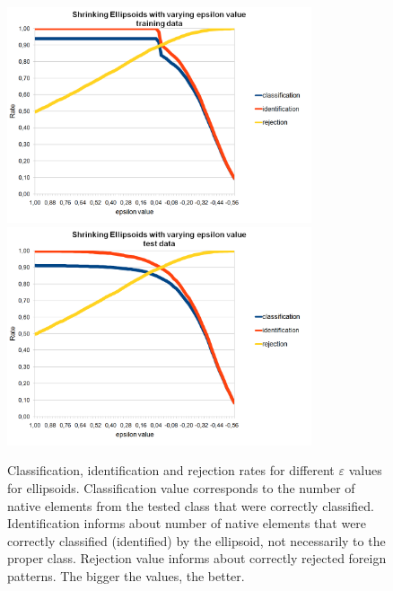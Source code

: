 \begin{figure}[htp]
	\centering
	\includegraphics[width=0.80\textwidth]{Figures/charts/DIGITS/DIGITS_ShrinkingEllipsoidsToleranceTraining.png}
	\hspace{12pt}
	\includegraphics[width=0.80\textwidth]{Figures/charts/DIGITS/DIGITS_ShrinkingEllipsoidsToleranceTest.png}
	\caption{ Classification, identification and rejection rates for different $\varepsilon$ values for ellipsoids. Classification value corresponds to the number of native elements from the tested class that were correctly classified. Identification informs about number of native elements that were correctly classified (identified) by the ellipsoid, not necessarily to the proper class. Rejection value informs about correctly rejected foreign patterns. The bigger the values, the better. }
	\label{fig:shrinking_ellipsoids_tolerance_manipulation}\vspace{-3pt}
\end{figure}

